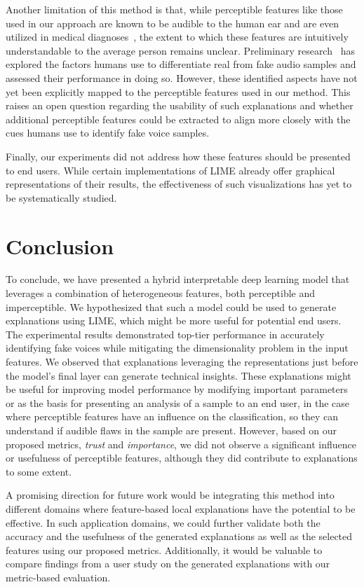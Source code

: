 \documentclass{article}
\begin{document}
Another limitation of this method is that, while perceptible features like those used in our approach are known to be audible to the human ear and are even utilized in medical diagnoses~\cite{chaiwongyen_deepfake-speech_2023}, the extent to which these features are intuitively understandable to the average person remains unclear. Preliminary research~\cite{warren_better_2024,sharevski_blind_2024} has explored the factors humans use to differentiate real from fake audio samples and assessed their performance in doing so. However, these identified aspects have not yet been explicitly mapped to the perceptible features used in our method. This raises an open question regarding the usability of such explanations and whether additional perceptible features could be extracted to align more closely with the cues humans use to identify fake voice samples.

Finally, our experiments did not address how these features should be presented to end users. While certain implementations of LIME already offer graphical representations of their results, the effectiveness of such visualizations has yet to be systematically studied.

\section{Conclusion}
To conclude, we have presented a hybrid interpretable deep learning model that leverages a combination of heterogeneous features, both perceptible and imperceptible. We hypothesized that such a model could be used to generate explanations using LIME, which might be more useful for potential end users. The experimental results demonstrated top-tier performance in accurately identifying fake voices while mitigating the dimensionality problem in the input features. We observed that explanations leveraging the representations just before the model’s final layer can generate technical insights. These explanations might be useful for improving model performance by modifying important parameters or as the basis for presenting an analysis of a sample to an end user, in the case where perceptible features have an influence on the classification, so they can understand if audible flaws in the sample are present. However, based on our proposed metrics, \textit{trust} and \textit{importance}, we did not observe a significant influence or usefulness of perceptible features, although they did contribute to explanations to some extent.

A promising direction for future work would be integrating this method into different domains where feature-based local explanations have the potential to be effective. In such application domains, we could further validate both the accuracy and the usefulness of the generated explanations as well as the selected features using our proposed metrics. Additionally, it would be valuable to compare findings from a user study on the generated explanations with our metric-based evaluation.
	\newpage
	\sloppy
	\printbibliography
\end{document}
